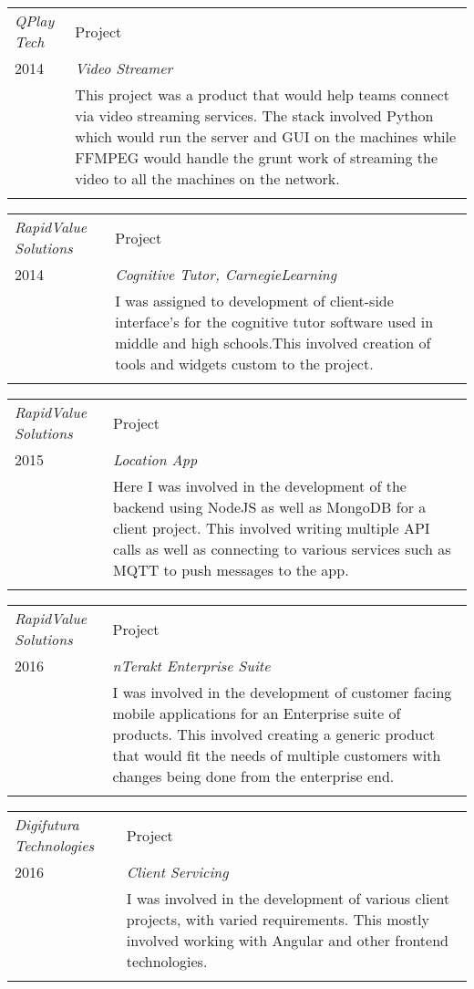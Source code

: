 \documentclass[a4paper]{article}
\begin{document}
\begin{tabular}{p{4cm}|p{13cm}}
\emph{QPlay Tech} & Project \\
\textsc{2014} & \emph{Video Streamer} \\
& \normalsize{This project was a product that would help teams connect via video streaming services. The stack involved Python which would run the server and GUI on the machines while FFMPEG would handle the grunt work of streaming the video to all the machines on the network.
}
\\
\multicolumn{2}{c}{}
\end{tabular}


\begin{tabular}{p{4cm}|p{13cm}}
\emph{RapidValue Solutions} & Project \\
\textsc{2014} & \emph{Cognitive Tutor, CarnegieLearning} \\
& \normalsize{I was assigned to development of client-side interface's for the cognitive tutor software used in middle and high schools.This involved creation of tools and widgets custom to the project.
}
\\
\multicolumn{2}{c}{}
\end{tabular}

\begin{tabular}{p{4cm}|p{13cm}}
\emph{RapidValue Solutions} & Project \\
\textsc{2015} & \emph{Location App} \\
& \normalsize{Here I was involved in the development of the backend using NodeJS as well as MongoDB for a client project. This involved writing multiple API calls as well as connecting to various services such as MQTT to push messages to the app.
}
\\
\multicolumn{2}{c}{}
\end{tabular}

\begin{tabular}{p{4cm}|p{13cm}}
\emph{RapidValue Solutions} & Project \\
\textsc{2016} & \emph{nTerakt Enterprise Suite} \\
& \normalsize{I was involved in the development of customer facing mobile applications for an Enterprise suite of products. This involved creating a generic product that would fit the needs of multiple customers with changes being done from the enterprise end.
}
\\
\multicolumn{2}{c}{}
\end{tabular}

\begin{tabular}{p{4cm}|p{13cm}}
\emph{Digifutura Technologies} & Project \\
\textsc{2016} & \emph{Client Servicing} \\
& \normalsize{I was involved in the development of various client projects, with varied requirements. This mostly involved working with Angular and other frontend technologies. 
}
\\
\multicolumn{2}{c}{}
\end{tabular}
\end{document}
